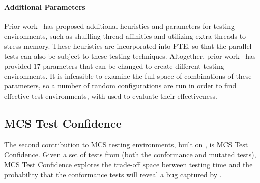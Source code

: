 \paragraph{Additional Parameters} Prior work~\cite{alglave2015gpu,kirkham2020foundations} has proposed additional heuristics and parameters for testing environments, such as shuffling thread affinities and utilizing extra threads to stress memory. These heuristics are incorporated into PTE, so that the parallel tests can also be subject to these testing techniques. Altogether, prior work~\cite{kirkham2020foundations} has provided 17 parameters that can be changed to create different testing environments. It is infeasible to examine the full space of combinations of these parameters, so a number of random configurations are run in order to find effective test environments, with \sys used to evaluate their effectiveness.

{\linespread{1.2}\selectfont
\begin{algorithm}
\small
\caption{Merging Test Environments}\label{alg:mc-mutants-cap}
\begin{algorithmic}[1]
\EndIf
{}
\EndIf
\EndFor
{}
\EndIf
\EndIf
\EndFor
{}
\EndFunction
\end{algorithmic}
\label{alg:mc-mutants-ceiling-rate}
\end{algorithm}
}

\subsection{MCS Test Confidence}
\label{sec:mc-mutants-rep-heuristic}
The second contribution to MCS testing environments, built on \sys, is MCS Test Confidence. Given a set of tests from \sys (both the conformance and mutated tests), MCS Test Confidence explores the trade-off space between testing time and the probability that the conformance tests will reveal a bug captured by \sys.

